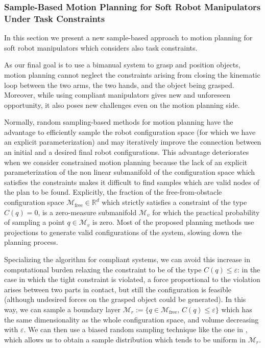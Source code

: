
\subsubsection{Sample-Based Motion Planning for Soft Robot Manipulators
Under Task Constraints} 
\label{sec:SampleBasedMotionPlanningSoftRobots}

In this section we present a new sample-based approach to motion planning for soft robot manipulators which considers also task constraints.

As our final goal is to use a bimanual system to grasp and position objects, motion planning cannot neglect the constraints arising from closing the kinematic loop between the two arms, the two hands, and the object being grasped. Moreover, while using compliant manipulators gives new and unforeseen opportunity, it also poses new challenges even on the motion planning side.

Normally, random sampling-based methods for motion planning have the advantage to efficiently sample the robot configuration space (for which we have an explicit parameterization) and may iteratively improve the connection between an initial and a desired final robot configurations.
This advantage deteriorates when we consider constrained motion planning because the lack of an explicit parameterization of the non linear submanifold of the configuration space which satisfies the constraints makes it difficult to find samples which are valid nodes of the plan to be found.
Explicitly, the fraction of the free-from-obstacle configuration space $ \mathcal{M}_{\text{free}} \in \mathbb{R}^{d} $ which strictly satisfies a constraint of the type $ C(q) = 0 $, is a zero-measure submanifold $ \mathcal{M}_{v} $ for which the practical probability of sampling a point $ q \in \mathcal{M}_{v} $ is zero.
Most of the proposed planning methods use projections to generate valid configurations of the system, slowing down the planning process.

Specializing the algorithm for compliant systems, we can avoid this increase in computational burden relaxing the constraint to be of the type $ C(q) \leq \varepsilon $: in the case in which the tight constraint is violated, a force proportional to the violation arises between two parts in contact, but still the configuration is feasible (although undesired forces on the grasped object could be generated).
In this way, we can sample a boundary layer $ \mathcal{M}_{r} := \{q \in \mathcal{M}_{\text{free}},\,C(q)\leq \varepsilon \} $ which has the same dimensionality as the whole configuration space, and volume decreasing with $ \varepsilon $.
We can then use a biased random sampling technique like the one in \cite{bialkowsky2013free}, which allows us to obtain a sample distribution which tends to be uniform in $ \mathcal{M}_{r} $.

